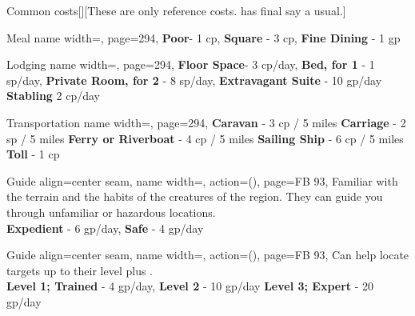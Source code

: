 \begin{PageBack}
\begin{Tables}{\backTableHeight}
\begin{Table}{Common costs}[][These are only reference costs. \GM has final say a usual.]
\begin{entry}{Meal}{%
                name width=\turnLength,%
                page=294,
            }
                \textbf{Poor}- 1 cp, \quad
                \textbf{Square} - 3 cp, \quad
                \textbf{Fine Dining} - 1 gp \quad
            \end{entry}
            \begin{entry}{Lodging}{%
                name width=\turnLength,%
                page=294,
            }
                \textbf{Floor Space}- 3 cp/day, \hfill
                \textbf{Bed, for 1} - 1 sp/day, \hfill
                \textbf{Private Room, for 2} - 8 sp/day, \hfill
                \textbf{Extravagant Suite} - 10 gp/day \hfill\vline\hfill \textbf{Stabling} 2 cp/day
            \end{entry}
            \begin{entry}{Transportation}{%
                name width=\turnLength,%
                page=294,
            }%
                \textbf{Caravan} - 3 cp / 5 miles\hfill
                \textbf{Carriage} - 2 sp / 5 miles\hfill
                \textbf{Ferry or Riverboat} - 4 cp / 5 miles\hfill
                \textbf{Sailing Ship} - 6 cp / 5 miles \hfill\vline\hfill
                \textbf{Toll} - 1 cp
            \end{entry}
            \breakLine[Help]
            \begin{entry}{Guide }{%
                align=center seam,
                name width=\turnLength,%
                action={\BodyFont ()},
                page=FB 93,
            }%
                Familiar with the terrain and the habits of the creatures of the region. They can guide you
                through unfamiliar or hazardous locations.\\
                \textbf{Expedient} - 6 gp/day,\quad
                \textbf{Safe} - 4 gp/day 
            \end{entry}
            \begin{entry}{Guide }{%
                align=center seam,
                name width=\turnLength,%
                action={\BodyFont ()},
                page=FB 93,
            }
                Can help locate targets up to their level plus . \hfill {}\\
                \textbf{Level 1; Trained} - 4 gp/day, \hfill
                \textbf{Level 2} - 10 gp/day\hfill
                \textbf{Level 3; Expert} - 20 gp/day\hfill

\end{entry}
\end{Table}
\end{Tables}
\end{PageBack}
